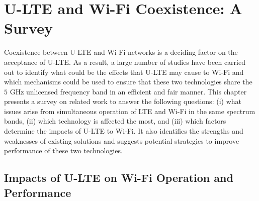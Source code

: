 %
%
%
\chapter{U-LTE and Wi-Fi Coexistence: A Survey}
\label{survey} %


Coexistence between \mbox{U-LTE} and \mbox{Wi-Fi} networks is a deciding factor on the acceptance of \mbox{U-LTE}. As a result, a large number of studies have been carried out to identify what could be the effects that \mbox{U-LTE} may cause to \mbox{Wi-Fi} and which mechanisms could be used to ensure that these two technologies share the $5$ GHz unlicensed frequency band in an efficient and fair manner. This chapter presents a survey on related work to answer the following questions: (i) what issues arise from simultaneous operation of LTE and \mbox{Wi-Fi} in the same spectrum bands, (ii) which technology is affected the most, and (iii) which factors determine the impacts of \mbox{U-LTE} to \mbox{Wi-Fi}. It also identifies the strengths and weaknesses of existing solutions and suggests potential strategies to improve performance of these two technologies.

\section{Impacts of U-LTE on Wi-Fi Operation and Performance}

